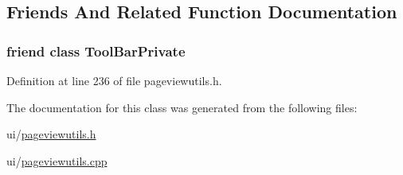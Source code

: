 \subsection{Friends And Related Function Documentation}
\hypertarget{classPageViewToolBar_ab7e46ef179a15868ff7dccbdf8e642f2}{
\subsubsection[{Tool\+Bar\+Private}]{\setlength{\rightskip}{0pt plus 5cm}friend class {\bf Tool\+Bar\+Private}\hspace{0.3cm}{\ttfamily [friend]}}}\label{classPageViewToolBar_ab7e46ef179a15868ff7dccbdf8e642f2}


Definition at line 236 of file pageviewutils.\+h.



The documentation for this class was generated from the following files\+:\begin{DoxyCompactItemize}
\item 
ui/\hyperlink{pageviewutils_8h}{pageviewutils.\+h}\item 
ui/\hyperlink{pageviewutils_8cpp}{pageviewutils.\+cpp}\end{DoxyCompactItemize}
